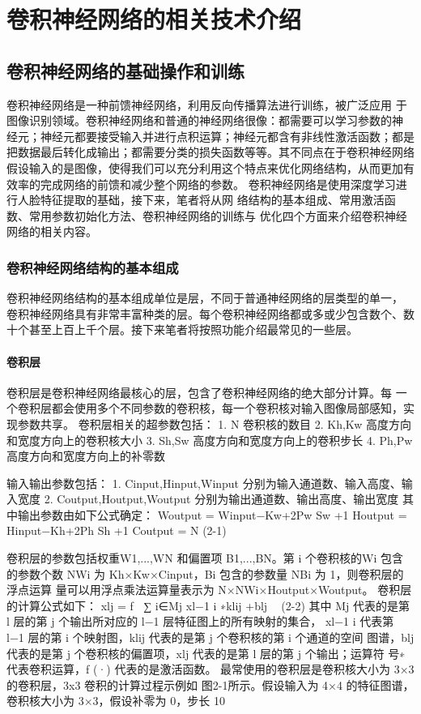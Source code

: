 \chapter{卷积神经网络的相关技术介绍}

\section{卷积神经网络的基础操作和训练}
卷积神经网络是一种前馈神经网络，利用反向传播算法进行训练，被广泛应用 于图像识别领域。卷积神经网络和普通的神经网络很像：都需要可以学习参数的神 经元；神经元都要接受输入并进行点积运算；神经元都含有非线性激活函数；都是 把数据最后转化成输出；都需要分类的损失函数等等。其不同点在于卷积神经网络 假设输入的是图像，使得我们可以充分利用这个特点来优化网络结构，从而更加有 效率的完成网络的前馈和减少整个网络的参数。 卷积神经网络是使用深度学习进行人脸特征提取的基础，接下来，笔者将从网 络结构的基本组成、常用激活函数、常用参数初始化方法、卷积神经网络的训练与 优化四个方面来介绍卷积神经网络的相关内容。



\subsection{卷积神经网络结构的基本组成}
卷积神经网络结构的基本组成单位是层，不同于普通神经网络的层类型的单一， 卷积神经网络具有非常丰富种类的层。每个卷积神经网络都或多或少包含数个、数 十个甚至上百上千个层。接下来笔者将按照功能介绍最常见的一些层。
\subsubsection{卷积层}
卷积层是卷积神经网络最核心的层，包含了卷积神经网络的绝大部分计算。每 一个卷积层都会使用多个不同参数的卷积核，每一个卷积核对输入图像局部感知，实 现参数共享。 卷积层相关的超参数包括：
1. N 卷积核的数目
2. Kh,Kw 高度方向和宽度方向上的卷积核大小
3. Sh,Sw 高度方向和宽度方向上的卷积步长
4. Ph,Pw 高度方向和宽度方向上的补零数

输入输出参数包括：
1. Cinput,Hinput,Winput 分别为输入通道数、输入高度、输入宽度
2. Coutput,Houtput,Woutput 分别为输出通道数、输出高度、输出宽度
其中输出参数由如下公式确定：
Woutput =
Winput−Kw+2Pw Sw
+1
Houtput =
Hinput−Kh+2Ph Sh
+1
Coutput = N
(2-1)

卷积层的参数包括权重W1,...,WN 和偏置项 B1,...,BN。第 i 个卷积核的Wi 包含 的参数个数 NWi 为 Kh×Kw×Cinput，Bi 包含的参数量 NBi 为 1，则卷积层的浮点运算 量可以用浮点乘法运算量表示为 N×NWi×Houtput×Woutput。 卷积层的计算公式如下： xlj = f ∑ i∈Mj xl−1 i ∗klij +blj  (2-2) 其中 Mj 代表的是第 l 层的第 j 个输出所对应的 l−1 层特征图上的所有映射的集合， xl−1 i 代表第 l−1 层的第 i 个映射图，klij 代表的是第 j 个卷积核的第 i 个通道的空间 图谱，blj 代表的是第 j 个卷积核的偏置项，xlj 代表的是第 l 层的第 j 个输出；运算符 号∗代表卷积运算，f (·) 代表的是激活函数。 最常使用的卷积层是卷积核大小为 3×3 的卷积层，3x3 卷积的计算过程示例如 图2-1所示。假设输入为 4×4 的特征图谱，卷积核大小为 3×3，假设补零为 0，步长
10

